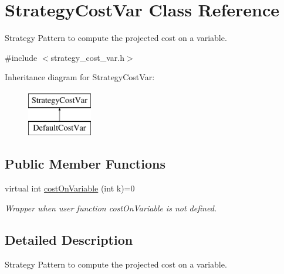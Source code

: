 \hypertarget{classStrategyCostVar}{\section{\-Strategy\-Cost\-Var \-Class \-Reference}
\label{classStrategyCostVar}
}


\-Strategy \-Pattern to compute the projected cost on a variable.  




{\ttfamily \#include $<$strategy\-\_\-cost\-\_\-var.\-h$>$}

\-Inheritance diagram for \-Strategy\-Cost\-Var\-:\begin{figure}[H]
\begin{center}
\leavevmode
\includegraphics[height=2.000000cm]{classStrategyCostVar}
\end{center}
\end{figure}
\subsection*{\-Public \-Member \-Functions}
\begin{DoxyCompactItemize}
\item 
virtual int \hyperlink{classStrategyCostVar_a8381829dfa84b3460822aa0e3677a443}{cost\-On\-Variable} (int k)=0
\begin{DoxyCompactList}\small\item\em \-Wrapper when user function cost\-On\-Variable is not defined. \end{DoxyCompactList}\end{DoxyCompactItemize}


\subsection{\-Detailed \-Description}
\-Strategy \-Pattern to compute the projected cost on a variable. 

